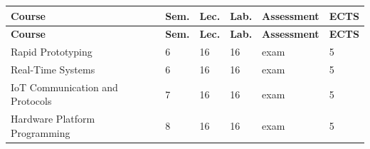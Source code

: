 \documentclass[12pt,a4paper]{article}
\newcommand{\thdrule}{\noalign{\global\setlength{\extrarowheight}{0pt}}}
\newcommand{\thdend}{\noalign{\global\setlength{\extrarowheight}{4pt}}}
\begin{document}
{\scriptsize
\begin{longtable}{m{6.5cm}m{0.7cm}m{1cm}m{1cm}m{1.7cm}m{0.7cm}}
\thdrule\toprule
\rowcolor{pjatkRed}
{\color{white}\footnotesize\textbf{\vphantom{Ag}Course}} & {\color{white}\footnotesize\textbf{\vphantom{Ag}Sem.}} & {\color{white}\footnotesize\textbf{\vphantom{Ag}Lec.}} & {\color{white}\footnotesize\textbf{\vphantom{Ag}Lab.}} & {\color{white}\footnotesize\textbf{\vphantom{Ag}Assessment}} & {\color{white}\footnotesize\textbf{\vphantom{Ag}ECTS}} \\
\midrule\thdend
\endfirsthead
\thdrule\toprule
\rowcolor{pjatkRed}
{\color{white}\footnotesize\textbf{\vphantom{Ag}Course}} & {\color{white}\footnotesize\textbf{\vphantom{Ag}Sem.}} & {\color{white}\footnotesize\textbf{\vphantom{Ag}Lec.}} & {\color{white}\footnotesize\textbf{\vphantom{Ag}Lab.}} & {\color{white}\footnotesize\textbf{\vphantom{Ag}Assessment}} & {\color{white}\footnotesize\textbf{\vphantom{Ag}ECTS}} \\
\midrule\thdend
\endhead
\rowcolor{tableRowLight} Rapid Prototyping & 6 & 16 & 16 & {\scriptsize exam} & 5 \\
\rowcolor{tableRowAlt} Real-Time Systems & 6 & 16 & 16 & {\scriptsize exam} & 5 \\
\rowcolor{tableRowLight} IoT Communication and Protocols & 7 & 16 & 16 & {\scriptsize exam} & 5 \\
\rowcolor{tableRowAlt} Hardware Platform Programming & 8 & 16 & 16 & {\scriptsize exam} & 5 \\
\bottomrule
\end{longtable}}
\end{document}
